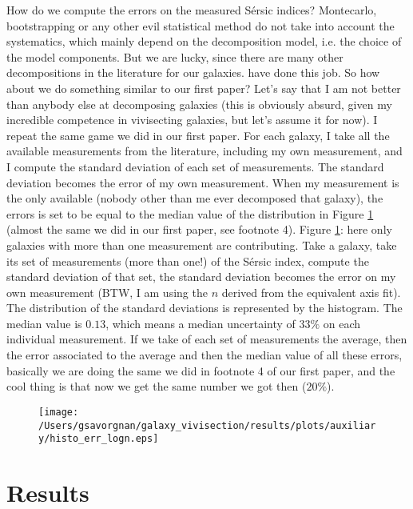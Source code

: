 \documentclass[preprint2]{aastex}
\begin{document}
How do we compute the errors on the measured S\'ersic indices?
Montecarlo, bootstrapping or any other evil statistical method do not take into account the systematics,
which mainly depend on the decomposition model, i.e. the choice of the model components.
But we are lucky, since there are many other decompositions in the literature for our galaxies.
\cite{grahamdriver2007,laurikainen2010,sani2011,vika2012,beifiori2012,rusli2013,lasker2014data} have done this job.
So how about we do something similar to our first paper?
Let's say that I am not better than anybody else at decomposing galaxies 
(this is obviously absurd, given my incredible competence in vivisecting galaxies, but let's assume it for now).
I repeat the same game we did in our first paper.
For each galaxy, I take all the available measurements from the literature, including my own measurement,
and I compute the standard deviation of each set of measurements.
The standard deviation becomes the error of my own measurement.
When my measurement is the only available (nobody other than me ever decomposed that galaxy),
the errors is set to be equal to the median value of the distribution in Figure \ref{fig:hist} 
(almost the same we did in our first paper, see footnote 4).
Figure \ref{fig:hist}: here only galaxies with more than one measurement are contributing.
Take a galaxy, take its set of measurements (more than one!) of the S\'ersic index, 
compute the standard deviation of that set, the standard deviation becomes the error on my own measurement
(BTW, I am using the $n$ derived from the equivalent axis fit).
The distribution of the standard deviations is represented by the histogram.
The median value is $0.13$, which means a median uncertainty of $33\%$ on each individual measurement.
If we take of each set of measurements the average, then the error associated to the average 
and then the median value of all these errors, basically we are doing the same we did in footnote 4 of our first paper,
and the cool thing is that now we get the same number we got then ($20\%$).




\begin{figure}
\texttt{[image: /Users/gsavorgnan/galaxy\_vivisection/results/plots/auxiliary/histo\_err\_logn.eps]}
\caption{}
\label{fig:hist}
\end{figure}

\section{Results}
\end{document}
